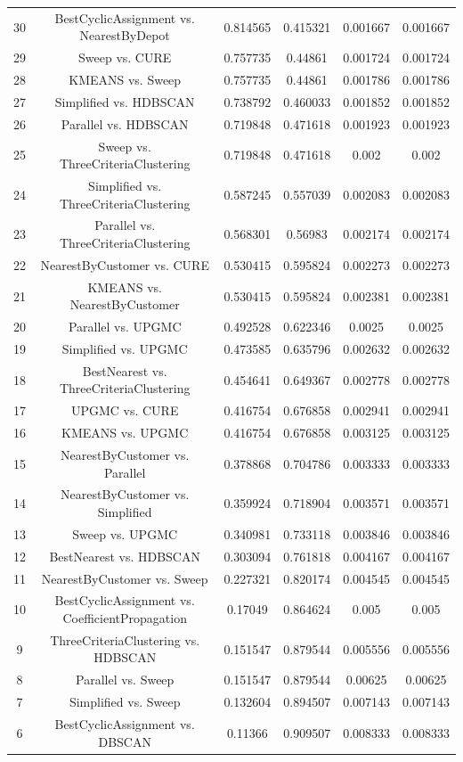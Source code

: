 \documentclass[a4paper,10pt]{article}
\begin{document}
\begin{landscape}
\begin{table}[!htp]
\begin{tabular}{cccccc}
30&BestCyclicAssignment vs. NearestByDepot&0.814565&0.415321&0.001667&0.001667\\
29&Sweep vs. CURE&0.757735&0.44861&0.001724&0.001724\\
28&KMEANS vs. Sweep&0.757735&0.44861&0.001786&0.001786\\
27&Simplified vs. HDBSCAN&0.738792&0.460033&0.001852&0.001852\\
26&Parallel vs. HDBSCAN&0.719848&0.471618&0.001923&0.001923\\
25&Sweep vs. ThreeCriteriaClustering&0.719848&0.471618&0.002&0.002\\
24&Simplified vs. ThreeCriteriaClustering&0.587245&0.557039&0.002083&0.002083\\
23&Parallel vs. ThreeCriteriaClustering&0.568301&0.56983&0.002174&0.002174\\
22&NearestByCustomer vs. CURE&0.530415&0.595824&0.002273&0.002273\\
21&KMEANS vs. NearestByCustomer&0.530415&0.595824&0.002381&0.002381\\
20&Parallel vs. UPGMC&0.492528&0.622346&0.0025&0.0025\\
19&Simplified vs. UPGMC&0.473585&0.635796&0.002632&0.002632\\
18&BestNearest vs. ThreeCriteriaClustering&0.454641&0.649367&0.002778&0.002778\\
17&UPGMC vs. CURE&0.416754&0.676858&0.002941&0.002941\\
16&KMEANS vs. UPGMC&0.416754&0.676858&0.003125&0.003125\\
15&NearestByCustomer vs. Parallel&0.378868&0.704786&0.003333&0.003333\\
14&NearestByCustomer vs. Simplified&0.359924&0.718904&0.003571&0.003571\\
13&Sweep vs. UPGMC&0.340981&0.733118&0.003846&0.003846\\
12&BestNearest vs. HDBSCAN&0.303094&0.761818&0.004167&0.004167\\
11&NearestByCustomer vs. Sweep&0.227321&0.820174&0.004545&0.004545\\
10&BestCyclicAssignment vs. CoefficientPropagation&0.17049&0.864624&0.005&0.005\\
9&ThreeCriteriaClustering vs. HDBSCAN&0.151547&0.879544&0.005556&0.005556\\
8&Parallel vs. Sweep&0.151547&0.879544&0.00625&0.00625\\
7&Simplified vs. Sweep&0.132604&0.894507&0.007143&0.007143\\
6&BestCyclicAssignment vs. DBSCAN&0.11366&0.909507&0.008333&0.008333\\

\end{tabular}
\end{table}
\end{landscape}
\end{document}
